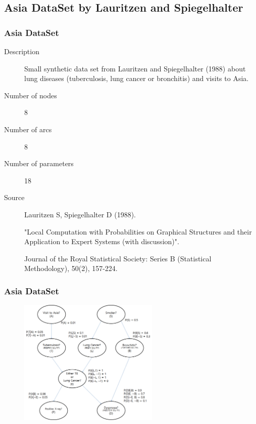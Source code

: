 \documentclass{beamer}
\begin{document}
\subsection{Asia DataSet by Lauritzen and Spiegelhalter}
\begin{frame}
\frametitle{Asia DataSet}
{\scriptsize{}
\begin{description}
	\item[Description] Small synthetic data set from Lauritzen and Spiegelhalter (1988) about lung diseases (tuberculosis, lung cancer or bronchitis) and visits to Asia.
	
	\item[Number of nodes] 8
	
	\item[Number of arcs] 8
	
	\item[Number of parameters] 18
	
	\item[Source] Lauritzen S, Spiegelhalter D (1988).
	
	"Local Computation with Probabilities on Graphical Structures and their Application to Expert Systems (with discussion)".
	
	Journal of the Royal Statistical Society: Series B (Statistical Methodology), 50(2), 157-224.
\end{description}
}
\end{frame}


\begin{frame}
\frametitle{Asia DataSet}
{\scriptsize{}
	\begin{figure}
		\includegraphics[height=170pt]{images/image01}
	\end{figure}	
}
\end{frame}
\end{document}
